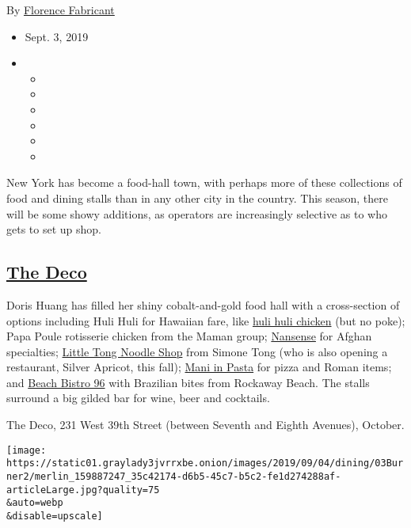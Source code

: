 By
\href{https://www.nytimes3xbfgragh.onion/by/florence-fabricant}{Florence
Fabricant}

\begin{itemize}
\item
  Sept. 3, 2019
\item
  \begin{itemize}
  \item
  \item
  \item
  \item
  \item
  \item
  \end{itemize}
\end{itemize}

New York has become a food-hall town, with perhaps more of these
collections of food and dining stalls than in any other city in the
country. This season, there will be some showy additions, as operators
are increasingly selective as to who gets to set up shop.

\hypertarget{the-deco}{%
\subsection{\texorpdfstring{\href{https://thedeconewyork.com/}{The
Deco}}{The Deco}}\label{the-deco}}

Doris Huang has filled her shiny cobalt-and-gold food hall with a
cross-section of options including Huli Huli for Hawaiian fare, like
\href{https://cooking.nytimes3xbfgragh.onion/recipes/1020347-huli-huli-chicken}{huli
huli chicken} (but no poke); Papa Poule rotisserie chicken from the
Maman group;
\href{https://www.nytimes3xbfgragh.onion/2018/11/29/dining/nansense-food-truck-review.html}{Nansense}
for Afghan specialties;
\href{https://www.nytimes3xbfgragh.onion/2017/07/11/dining/little-tong-noodle-shop-review-east-village.html}{Little
Tong Noodle Shop} from Simone Tong (who is also opening a restaurant,
Silver Apricot, this fall); \href{https://www.maniinpastamenu.com/}{Mani
in Pasta} for pizza and Roman items; and
\href{https://www.nytimes3xbfgragh.onion/2016/07/20/dining/brazilian-food-rockaways-beach-bistro-96.html}{Beach
Bistro 96} with Brazilian bites from Rockaway Beach. The stalls surround
a big gilded bar for wine, beer and cocktails.

The Deco, 231 West 39th Street (between Seventh and Eighth Avenues),
October.

\texttt{[image: https://static01.graylady3jvrrxbe.onion/images/2019/09/04/dining/03Burner2/merlin\_159887247\_35c42174-d6b5-45c7-b5c2-fe1d274288af-articleLarge.jpg?quality=75\\\&auto=webp\\\&disable=upscale]}

